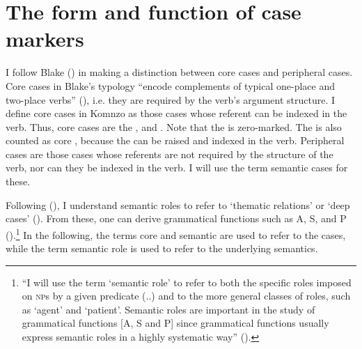 \section{The form and function of case markers}\label{formfunccase}
\largerpage
I follow Blake (\citeyear{Blake:case}) in making a distinction between core cases and peripheral cases. Core cases in Blake's typology ``encode complements of typical one-place and two-place  verbs'' (\citeyear[32]{Blake:case}), i.e. they are required by the verb's argument structure. I define core cases in Komnzo as those cases whose referent can be indexed in the verb. Thus, core cases are the ,  and  . Note that the  is zero-marked. The  is also counted as core , because the  can be raised and indexed in the verb. Peripheral cases are those cases whose referents are not required by the structure of the verb, nor can they be indexed in the verb. I will use the term semantic cases for these.%

Following (\citealt{Andrews:2007nounphrase}), I understand semantic roles to refer to `thematic relations' or `deep cases' (\citealt{Fillmore:1968case}). From these, one can derive grammatical functions such as A, S, and P (\citealt{Dixon:1972dyirbal}).\footnote{``I will use the term ‘semantic role’ to refer to both the specific roles imposed on \textsc{np}s by a given predicate (..) and to the more general classes of roles, such as ‘agent’ and ‘patient’. Semantic roles are important in the study of grammatical functions [A, S and P] since grammatical functions usually express semantic roles in a highly systematic way'' (\citealt[136]{Andrews:2007nounphrase}).} In the following, the terms core  and semantic  are used to refer to the cases, while the term semantic role is used to refer to the underlying semantics.%

